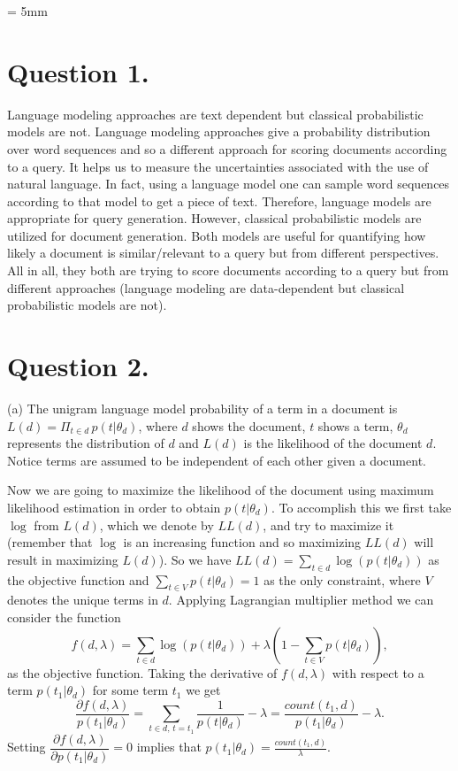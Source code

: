 \documentclass[11pt]{article}
\begin{document}



\baselineskip = 5mm

%

\section*{Question 1.}%
Language modeling approaches are text dependent but classical probabilistic models are not. Language modeling approaches give a probability distribution over word sequences and so a different approach for scoring documents according to a query. It helps us to measure the uncertainties associated with the use of natural language. In fact, using a language model one can sample word sequences according to that model to get a piece of text. Therefore, language models are appropriate for query generation. However, classical probabilistic models are utilized for document generation. Both models are useful for quantifying how likely a document is similar/relevant to a query but from different perspectives. All in all, they both are trying to score documents according to a query but from different approaches (language modeling are data-dependent but classical probabilistic models are not). 


\section*{Question 2.}
(a) The unigram language model probability of a term in a document is $L(d) = \Pi_{t \in d} \, p(t | \theta_d)$, where $d$ shows the document, $t$ shows a term, $\theta_d$ represents the distribution of $d$ and $L(d)$ is the likelihood of the document $d$. Notice terms are assumed to be independent of each other given a document. 

Now we are going to maximize the likelihood of the document using maximum likelihood estimation in order to obtain $p(t | \theta_d)$. To accomplish this we first take $\log$ from $L(d)$, which we denote by $LL(d)$, and try to maximize it (remember that $\log$ is an increasing function and so maximizing $LL(d)$ will result in maximizing $L(d)$). So we have $LL(d) = \sum_{t \in d} \log(p(t| \theta_d))$ as the objective function and $\sum_{t \in V} p(t| \theta_d) =1$ as the only constraint, where $V$ denotes the unique terms in $d$.  Applying Lagrangian multiplier method we can consider the function 
$$f(d, \lambda) = \sum_{t \in d} \log(p(t| \theta_d)) + \lambda (1 - \sum_{t \in V} p(t| \theta_d)),$$ 
as the objective function.  Taking the derivative of $f(d, \lambda)$ with respect to a term $p(t_1 | \theta_d)$ for some term $t_1$ we get 
$$\dfrac{\partial f(d, \lambda)}{p(t_1 | \theta_d)} = \sum_{t \in d, \, t=t_1} \frac{1}{p(t | \theta_d)} - \lambda = \frac{count(t_1, d)}{p(t_1 | \theta_d)} - \lambda.$$ 
Setting $\dfrac{\partial f(d, \lambda)}{\partial p(t_1 | \theta_d)} =0$ implies that $p(t_1 | \theta_d) = \frac{count(t_1, d)}{\lambda}$. 
\end{document}
